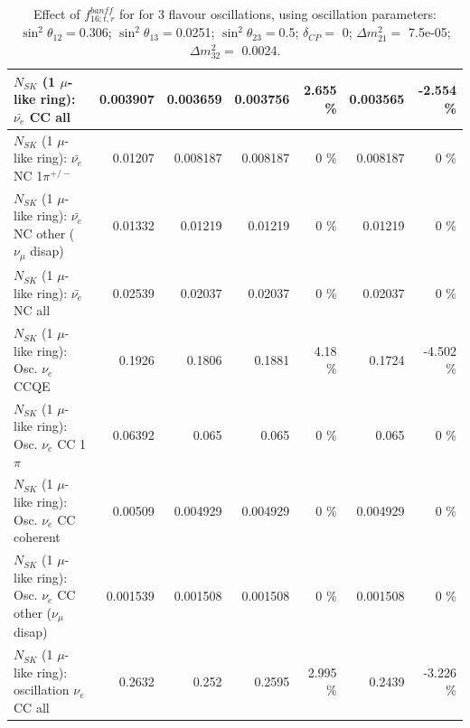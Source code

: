 \begin{table}
\begin{tabular}{| l | r | r | r  r | r  r |}
                            $N_{SK}$ (1 $\mu$-like ring): $\bar{\nu_{e}}$ CC all &        0.003907 &        0.003659 &        0.003756 &    2.655 \%  &        0.003565 &   -2.554 \%  \\ 
\hline
                     $N_{SK}$ (1 $\mu$-like ring): $\bar{\nu_e}$ NC 1$\pi^{+/-}$ &         0.01207 &        0.008187 &        0.008187 &        0 \%  &        0.008187 &        0 \%  \\ 
          $N_{SK}$ (1 $\mu$-like ring): $\bar{\nu_e}$ NC other ($\nu_\mu$ disap) &         0.01332 &         0.01219 &         0.01219 &        0 \%  &         0.01219 &        0 \%  \\ 
                            $N_{SK}$ (1 $\mu$-like ring): $\bar{\nu_{e}}$ NC all &         0.02539 &         0.02037 &         0.02037 &        0 \%  &         0.02037 &        0 \%  \\ 
\hline
\hline
\hline
                                 $N_{SK}$ (1 $\mu$-like ring): Osc. $\nu_e$ CCQE &          0.1926 &          0.1806 &          0.1881 &     4.18 \%  &          0.1724 &   -4.502 \%  \\ 
                            $N_{SK}$ (1 $\mu$-like ring): Osc. $\nu_e$ CC 1$\pi$ &         0.06392 &           0.065 &           0.065 &        0 \%  &           0.065 &        0 \%  \\ 
                          $N_{SK}$ (1 $\mu$-like ring): Osc. $\nu_e$ CC coherent &         0.00509 &        0.004929 &        0.004929 &        0 \%  &        0.004929 &        0 \%  \\ 
           $N_{SK}$ (1 $\mu$-like ring): Osc. $\nu_e$ CC other ($\nu_\mu$ disap) &        0.001539 &        0.001508 &        0.001508 &        0 \%  &        0.001508 &        0 \%  \\ 
                        $N_{SK}$ (1 $\mu$-like ring): oscillation $\nu_e$ CC all &          0.2632 &           0.252 &          0.2595 &    2.995 \%  &          0.2439 &   -3.226 \%  \\ 
\hline
\hline
\end{tabular}
\caption{ Effect of $f_{16; t, r}^{banff}$ for for 3 flavour oscillations, using oscillation parameters:  $\sin^2\theta_{12} = $0.306; $\sin^2\theta_{13} = $0.0251; $\sin^2\theta_{23} = $0.5; $\delta_{CP} = $        0; $\Delta m^2_{21} = $    7.5e-05; $\Delta m^2_{32} = $    0.0024. }
\label{tab:num_banff_maqe_1RmuT_3f_osc_t13:0.0251}
\end{table}
\clearpage
